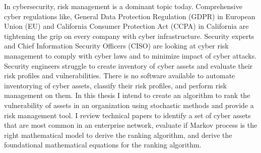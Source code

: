 In cybersecurity, risk management is a dominant topic today. Comprehensive cyber regulations like, General Data Protection Regulation (GDPR) in European Union (EU) and California Consumer Protection Act (CCPA) in California are tightening the grip on every company with cyber infrastructure. Security experts and Chief Information Security Officers (CISO) are looking at cyber risk management to comply with cyber laws and to minimize impact of cyber attacks. Security engineers struggle to create inventory of cyber assets and evaluate their risk profiles and vulnerabilities. There is no software available to automate inventorying of cyber assets, classify their risk profiles, and perform risk management on them. In this thesis I intend to create an algorithm to rank the vulnerability of assets in an organization using stochastic methods and provide a risk management tool. I review technical papers to identify a set of cyber assets that are most common in an enterprise network, evaluate if Markov process is the right mathematical model to derive the ranking algorithm, and derive the foundational mathematical equations for the ranking algorithm.